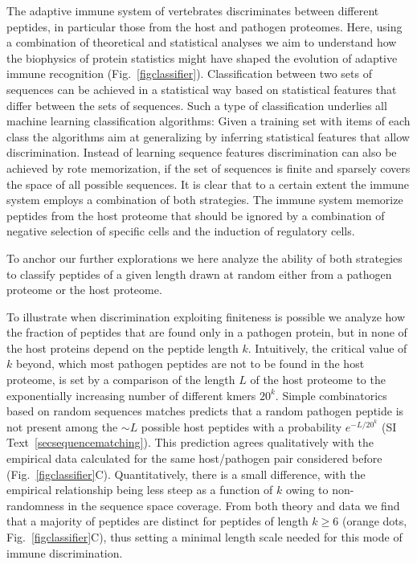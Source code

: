 \documentclass[superscriptaddress,twocolumn,pre]{revtex4}
\newcommand{\<}{\langle}
\renewcommand{\>}{\rangle}
\begin{document}
The adaptive immune system of vertebrates discriminates between different peptides, in particular those from the host and pathogen proteomes. Here, using a combination of theoretical and statistical analyses we aim to understand how the biophysics of protein statistics might have shaped the evolution of adaptive immune recognition (Fig.~\ref{figclassifier}). Classification between two sets of sequences can be achieved in a statistical way based on statistical features that differ between the sets of sequences. Such a type of classification underlies all machine learning classification algorithms: Given a training set with items of each class the algorithms aim at generalizing by inferring statistical features that allow discrimination. Instead of learning sequence features discrimination can also be achieved by rote memorization, if the set of sequences is finite and sparsely covers the space of all possible sequences. It is clear that to a certain extent the immune system employs a combination of both strategies. The immune system memorize peptides from the host proteome that should be ignored by a combination of negative selection of specific cells and the induction of regulatory cells. 

To anchor our further explorations we here analyze the ability of both strategies to classify peptides of a given length drawn at random either from a pathogen proteome or the host proteome.

To illustrate when discrimination exploiting finiteness is possible we analyze how the fraction of peptides that are found only in a pathogen protein, but in none of the host proteins depend on the peptide length $k$. Intuitively, the critical value of $k$ beyond, which most pathogen peptides are not to be found in the host proteome, is set by a comparison of the length $L$ of the host proteome to the exponentially increasing number of different kmers $20^k$. Simple combinatorics based on random sequences matches predicts that a random pathogen peptide is not present among the $\sim L$ possible host peptides with a probability $e^{-L/20^k}$ (SI Text~\ref{secsequencematching}). This prediction agrees qualitatively with the empirical data calculated for the same host/pathogen pair considered before (Fig.~\ref{figclassifier}C). Quantitatively, there is a small difference, with the empirical relationship being less steep as a function of $k$ owing to non-randomness in the sequence space coverage. From both theory and data we find that a majority of peptides are distinct for peptides of length $k\geq6$ (orange dots, Fig.~\ref{figclassifier}C), thus setting a minimal length scale needed for this mode of immune discrimination.  
\end{document}
